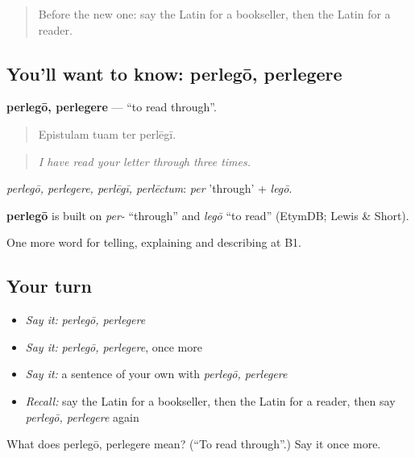 \label{lesson:LA-C550-perlego}



\begin{quote}
Before the new one: say the Latin for a bookseller, then the Latin for a reader.
\end{quote}

\subsection*{You'll want to know: perlegō, perlegere}
\textbf{perlegō, perlegere} — \textquotedblleft{}to read through\textquotedblright{}.

\begin{quote}
Epistulam tuam ter perlēgī.
\end{quote}

\begin{quote}
\emph{I have read your letter through three times.}
\end{quote}

\emph{perlegō, perlegere, perlēgī, perlēctum}: \emph{per} 'through' + \emph{legō}.

\begin{cousinweb}
\textbf{perlegō} is built on \emph{per-} \textquotedblleft{}through\textquotedblright{} and \emph{legō} \textquotedblleft{}to read\textquotedblright{} (EtymDB; Lewis \& Short).
\end{cousinweb}

\begin{grammarlens}[title={What you've built}]
One more word for telling, explaining and describing at B1.
\end{grammarlens}

\subsection*{Your turn}
\begin{itemize}
\raggedright
  \item \emph{Say it:} \emph{perlegō, perlegere}
  \item \emph{Say it:} \emph{perlegō, perlegere}, once more
  \item \emph{Say it:} a sentence of your own with \emph{perlegō, perlegere}
  \item \emph{Recall:} say the Latin for a bookseller, then the Latin for a reader, then say \emph{perlegō, perlegere} again
\end{itemize}

\begin{tcolorbox}[breakable,colback=teal!4,colframe=teal!35!black,title={Before you move on}]
What does perlegō, perlegere mean? (\textquotedblleft{}To read through\textquotedblright{}.) Say it once more.
\end{tcolorbox}
